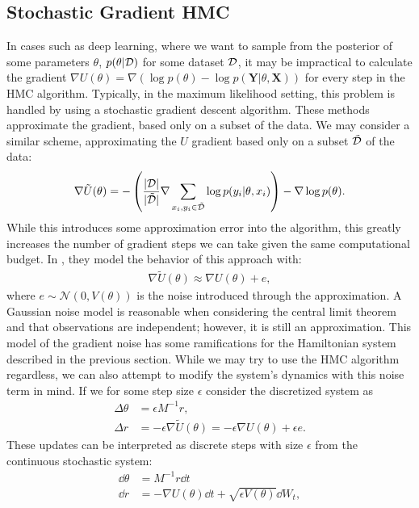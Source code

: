 \subsection{Stochastic Gradient HMC}
In cases such as deep learning, where we want to sample from the posterior of some parameters $\theta$,  $p(\theta | \mathcal{D})$ for some dataset $\mathcal{D}$, it may be impractical to calculate the gradient $\nabla U(\theta) = \nabla\left( \log{p(\theta)} - \log{p(\bm{Y} | \theta, \bm{X})} \right)$ for every step in the HMC algorithm. 
Typically, in the maximum likelihood setting, this problem is handled by using a stochastic gradient descent algorithm. 
These methods approximate the gradient, based only on a subset of the data. 
We may consider a similar scheme, approximating the $U$ gradient based only on a subset $\tilde{\mathcal{D}}$ of the data:
\begin{align}
    \nabla\tilde{U}(\theta) = -\left(\frac{|\mathcal{D}|}{|\tilde{\mathcal{D}}|}  \nabla \sum_{x_i, y_i\in \tilde{\mathcal{D}}} \log{p(y_i |\theta, x_i)}\right)  -\nabla \log{p(\theta)}.
\end{align}
While this introduces some approximation error into the algorithm, this greatly increases the number of gradient steps we can take given the same computational budget.
In \cite{chen_stochastic_2014}, they model the behavior of this approach with:
\begin{align} \label{eq:sghmc-model}
    \nabla\tilde{U}(\theta) \approx \nabla{U}(\theta) + e,
\end{align}
where $e \sim \mathcal{N}(0, V(\theta))$ is the noise introduced through the approximation.
A Gaussian noise model is reasonable when considering the central limit theorem and that observations are independent; however, it is still an approximation.
This model of the gradient noise has some ramifications for the Hamiltonian system described in the previous section. 
While we may try to use the HMC algorithm regardless, we can also attempt to modify the system's dynamics with this noise term in mind.
If we for some step size $\epsilon$ consider the discretized system as
\begin{align}
    \Delta \theta &=  \epsilon M^{-1} r,\\
    \Delta r &=  -\epsilon\nabla{\tilde{U}}(\theta) = -\epsilon\nabla{U}(\theta)  + \epsilon e.
\end{align}
These updates can be interpreted as discrete steps with size $\epsilon$ from the continuous stochastic system:
\begin{align} 
    \dd{\theta} &= M^{-1} r\dd{t} \\
    \dd{r} &= -\nabla{U}(\theta)\dd{t}  + \sqrt{\epsilon V(\theta)} \dd{W_t},
\end{align}
